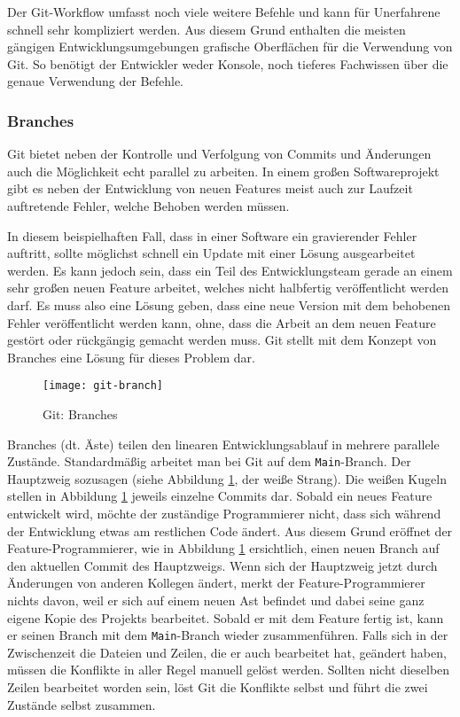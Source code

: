 Der Git-Workflow umfasst noch viele weitere Befehle und kann für Unerfahrene
schnell sehr kompliziert werden. Aus diesem Grund enthalten die meisten gängigen
Entwicklungsumgebungen grafische Oberflächen für die Verwendung von Git. So
benötigt der Entwickler weder Konsole, noch tieferes Fachwissen über die genaue
Verwendung der Befehle.

\subsubsection{Branches}
Git bietet neben der Kontrolle und Verfolgung von Commits und Änderungen auch
die Möglichkeit echt parallel zu arbeiten. In einem großen Softwareprojekt gibt
es neben der Entwicklung von neuen Features meist auch zur Laufzeit auftretende
Fehler, welche Behoben werden müssen.

In diesem beispielhaften Fall, dass in einer Software ein gravierender Fehler
auftritt, sollte möglichst schnell ein Update mit einer Lösung ausgearbeitet
werden. Es kann jedoch sein, dass ein Teil des Entwicklungsteam gerade an einem
sehr großen neuen Feature arbeitet, welches nicht halbfertig veröffentlicht
werden darf. Es muss also eine Lösung geben, dass eine neue Version mit dem
behobenen Fehler veröffentlicht werden kann, ohne, dass die Arbeit an dem neuen
Feature gestört oder rückgängig gemacht werden muss. Git stellt mit dem Konzept
von Branches eine Lösung für dieses Problem dar.

\begin{figure}[h]
    \centering
    \texttt{[image: git-branch]}
    \caption{Git: Branches}
    \label{fig:git-branch}
\end{figure}

Branches (dt. Äste) teilen den linearen Entwicklungsablauf in mehrere parallele
Zustände. Standardmäßig arbeitet man bei Git auf dem \texttt{Main}-Branch. Der
Hauptzweig sozusagen (siehe Abbildung \ref{fig:git-branch}, der weiße Strang).
Die weißen Kugeln stellen in Abbildung \ref{fig:git-branch} jeweils einzelne
Commits dar. Sobald ein neues Feature entwickelt wird, möchte der zuständige
Programmierer nicht, dass sich während der Entwicklung etwas am
restlichen Code ändert. Aus diesem Grund eröffnet der Feature-Programmierer, wie
in Abbildung \ref{fig:git-branch} ersichtlich, einen neuen Branch auf den
aktuellen Commit des Hauptzweigs. Wenn sich der Hauptzweig jetzt durch
Änderungen von anderen Kollegen ändert, merkt der Feature-Programmierer nichts
davon, weil er sich auf einem neuen Ast befindet und dabei seine ganz eigene
Kopie des Projekts bearbeitet. Sobald er mit dem Feature fertig ist, kann er
seinen Branch mit dem \texttt{Main}-Branch wieder zusammenführen. Falls sich in
der Zwischenzeit die Dateien und Zeilen, die er auch bearbeitet hat, geändert
haben, müssen die Konflikte in aller Regel manuell gelöst werden. Sollten nicht
dieselben Zeilen bearbeitet worden sein, löst Git die Konflikte selbst und führt
die zwei Zustände selbst zusammen.


